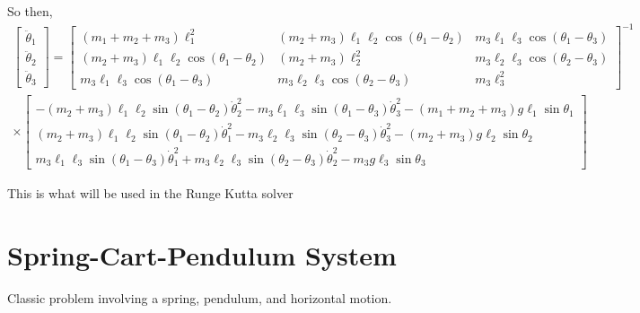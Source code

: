 \documentclass[letterpaper,8pt]{article}
\begin{document}
So then,
\begin{multline*}
\left[ \begin{array}{ccc}
       \ddot{\theta}_1 \\ \ddot{\theta}_2 \\ \ddot{\theta}_3 
\end{array}\right]
= 
\left[ \begin{array}{ccc}
       (m_1 + m_2 + m_3)\ell_1^2 & (m_2 + m_3)\ell_1\ell_2 \cos(\theta_1 - \theta_2) & m_3 \ell_1 \ell_3 \cos (\theta_1 - \theta_3) \\
       (m_2 + m_3) \ell_1 \ell_2 \cos (\theta_1 - \theta_2) & (m_2 + m_3) \ell_2^2 & m_3 \ell_2 \ell_3 \cos (\theta_2 - \theta_3) \\
       m_3 \ell_1 \ell_3 \cos (\theta_1 - \theta_3) & m_3 \ell_2 \ell_3 \cos (\theta_2 - \theta_3) & m_3 \ell_3^2 
\end{array}\right]^{-1} \\
\times
\left[ \begin{array}{ccc}
    -(m_2 + m_3)\ell_1\ell_2 \sin(\theta_1 - \theta_2)\dot{\theta}_2^2 - m_3 \ell_1 \ell_3 \sin (\theta_1 - \theta_3)\dot{\theta}_3^2 - (m_1 + m_2 + m_3) g \ell_1 \sin \theta_1 \\
    (m_2 + m_3) \ell_1 \ell_2 \sin (\theta_1 - \theta_2) \dot{\theta}_1^2 - m_3 \ell_2 \ell_3 \sin (\theta_2 - \theta_3) \dot{\theta}_3^2 - (m_2 + m_3) g \ell_2 \sin \theta_2  \\
    m_3 \ell_1 \ell_3 \sin (\theta_1 - \theta_3) \dot{\theta}_1^2 + m_3 \ell_2 \ell_3 \sin (\theta_2 - \theta_3) \dot{\theta}_2^2 - m_3 g \ell_3 \sin \theta_3 
\end{array}\right]
\end{multline*}

This is what will be used in the Runge Kutta solver


\newpage
\section{Spring-Cart-Pendulum System}

Classic problem involving a spring, pendulum, and horizontal motion.
\end{document}
